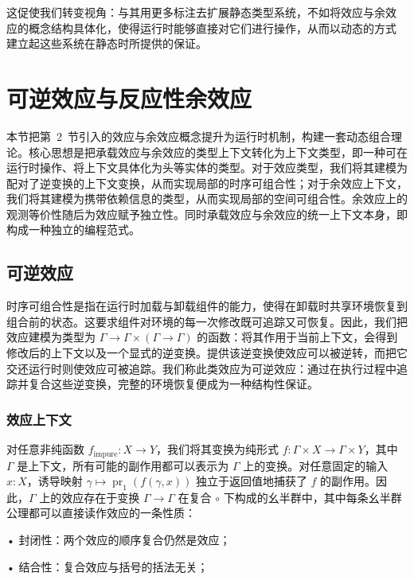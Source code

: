 \documentclass[
  10
]{article}
\begin{document}
这促使我们转变视角：与其用更多标注去扩展静态类型系统，不如将效应与余效
应的概念结构具体化，使得运行时能够直接对它们进行操作，从而以动态的方式
建立起这些系统在静态时所提供的保证。
\section{可逆效应与反应性余效应} \label{revertible-efects-and-reactive-coefects}

本节把第~2~节引入的效应与余效应概念提升为运行时机制，构建一套动态组合理论。核心思想是把承载效应与余效应的类型上下文转化为上下文类型，即一种可在运行时操作、将上下文具体化为头等实体的类型。对于效应类型，我们将其建模为配对了逆变换的上下文变换，从而实现局部的时序可组合性；对于余效应上下文，我们将其建模为携带依赖信息的类型，从而实现局部的空间可组合性。余效应上的观测等价性随后为效应赋予独立性。同时承载效应与余效应的统一上下文本身，即构成一种独立的编程范式。

\subsection{可逆效应} \label{revertible-efects}

时序可组合性是指在运行时加载与卸载组件的能力，使得在卸载时共享环境恢复到组合前的状态。这要求组件对环境的每一次修改既可追踪又可恢复。因此，我们把效应建模为类型为
\(\Gamma \to \Gamma \times ( \Gamma \to \Gamma )\)
的函数：将其作用于当前上下文，会得到修改后的上下文以及一个显式的逆变换。提供该逆变换使效应可以被逆转，而把它交还运行时则使效应可被追踪。我们称此类效应为可逆效应：通过在执行过程中追踪并复合这些逆变换，完整的环境恢复便成为一种结构性保证。

\subsubsection{效应上下文} \label{efect-context}

对任意非纯函数 \(f _ { \mathrm { i m p u r e } } : X \to Y\)，我们将其变换为纯形式
\(f : \Gamma \times X \to \Gamma \times Y\)，其中 $\Gamma$ 是上下文，所有可能的副作用都可以表示为 $\Gamma$ 上的变换。对任意固定的输入 \(x : X\)，诱导映射
\(\gamma \mapsto \operatorname { p r } _ { 1 } ( f ( \gamma , x ) )\)
独立于返回值地捕获了 \(f\) 的副作用。因此，$\Gamma$ 上的效应存在于变换 $\Gamma \to \Gamma$ 在复合 \(\circ\) 下构成的幺半群中，其中每条幺半群公理都可以直接读作效应的一条性质：

• 封闭性：两个效应的顺序复合仍然是效应；

• 结合性：复合效应与括号的括法无关；
\end{document}
